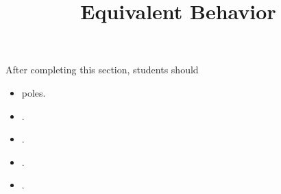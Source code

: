 \documentclass{ximera}
\title{Equivalent Behavior}
\begin{document}
\begin{abstract}
\end{abstract}
\maketitle

\begin{sectionOutcomes}
After completing this section, students should 

\begin{itemize}
\item poles.
\item .
\item .
\item .
\item .
\end{itemize}
\end{sectionOutcomes}
\end{document}
